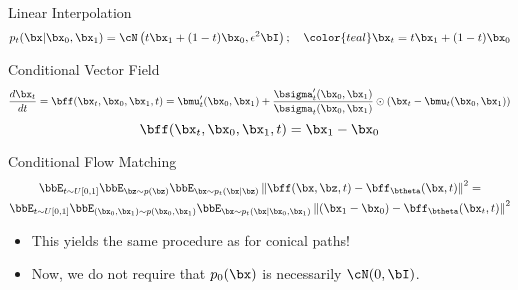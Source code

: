 \documentclass{beamer}
\begin{document}
\begin{frame}{Linear Interpolation}
	\vspace{-0.3cm}
	\[
		p_t(\bx | \bx_0, \bx_1) = \cN\left(t \bx_1 + (1 - t) \bx_0, \epsilon^2 \bI\right); \quad {\color{teal}\bx_t = t \bx_1 + (1 - t) \bx_0}
	\]
	\vspace{-0.5cm}
	\begin{block}{Conditional Vector Field}
		\vspace{-0.5cm}
		\[
			 \frac{d\bx_t}{dt} = \bff(\bx_t, \bx_0, \bx_1, t) =  \bmu_t'(\bx_0, \bx_1) + \frac{\bsigma_t'(\bx_0, \bx_1)}{\bsigma_t(\bx_0, \bx_1)} \odot (\bx_t - \bmu_t(\bx_0, \bx_1))
		\]
		\eqpause
		\vspace{-0.5cm}
		\[
			\bff(\bx_t, \bx_0, \bx_1, t) = \bx_1 - \bx_0
		\]
		\vspace{-0.7cm}
	\end{block}
	\eqpause
	\begin{block}{Conditional Flow Matching}
		\vspace{-0.7cm}
		\begin{multline*}
			\bbE_{t \sim U[0, 1]} \bbE_{\bz \sim p(\bz)} \bbE_{\bx \sim p_t(\bx | \bz)}\left\| \bff(\bx, \bz, t) - \bff_{\btheta}(\bx, t) \right\|^2 = \\
		 \bbE_{t \sim U[0, 1]} \bbE_{(\bx_0, \bx_1) \sim p(\bx_0, \bx_1)} \bbE_{\bx \sim p_t(\bx | \bx_0, \bx_1)} \left\| (\bx_1 - \bx_0) - \bff_{\btheta}(\bx_t, t) \right\|^2
		\end{multline*}
	\end{block}
	\eqpause
	\vspace{-0.3cm}
	\begin{itemize}
		\item This yields the same procedure as for conical paths!
		\item Now, we do not require that $p_0(\bx)$ is necessarily $\cN(0, \bI)$.
	\end{itemize} 
\end{frame}
\end{document}
